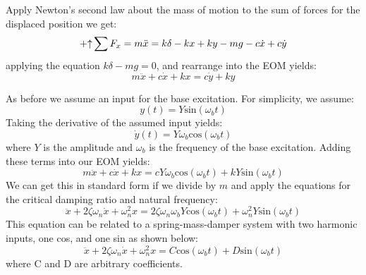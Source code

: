 \documentclass[12pt,letter]{article}
\begin{document}
	Apply Newton's second law about the mass of motion to the sum of forces for the displaced position we get:
	\begin{equation}
	\mathbin{+\mathord\uparrow} \sum F_x = m\ddot{x} = k\delta -kx + ky -mg -c\dot{x} +c\dot{y}
	\end{equation}	
	applying the equation $k\delta -mg =0$, and rearrange into the EOM yields:	
	\begin{equation}
	m\ddot{x} + c\dot{x} + kx = c\dot{y} + ky 
	\end{equation}

	As before we assume an input for the base excitation. For simplicity, we assume:
	\begin{equation}
	y(t) = Y\text{sin}(\omega_b t)
	\end{equation}
	Taking the derivative of the assumed input yields:
	\begin{equation}
	\dot{y}(t) = Y \omega_b \text{cos}(\omega_b t)
	\end{equation}
	where $Y$ is the amplitude and $\omega_b$ is the frequency of the base excitation. Adding these terms into our EOM yields:
	\begin{equation}
	m\ddot{x} + c\dot{x} + kx = c Y \omega_b \text{cos}(\omega_b t)  + k Y\text{sin}(\omega_b t)  
	\end{equation}
	We can get this in standard form if we divide by $m$ and apply the equations for the critical damping ratio and natural frequency:
	\begin{equation}
	\ddot{x} + 2 \zeta \omega_n \dot{x} + \omega_n^2x = 2 \zeta \omega_n \omega_b Y \text{cos}(\omega_b t)  + \omega_n^2 Y\text{sin}(\omega_b t)
	\label{eq:standard_form_base_excitation}  
	\end{equation}
	This equation can be related to a spring-mass-damper system with two harmonic inputs, one cos, and one sin as shown below:
	\begin{equation}
	\ddot{x} + 2 \zeta \omega_n \dot{x} + \omega_n^2x = C \text{cos}(\omega_b t)  + D \text{sin}(\omega_b t)  
	\label{eq:standard_form_base_excitation_CD}
	\end{equation}
	where C and D are arbitrary coefficients. 
\end{document}
